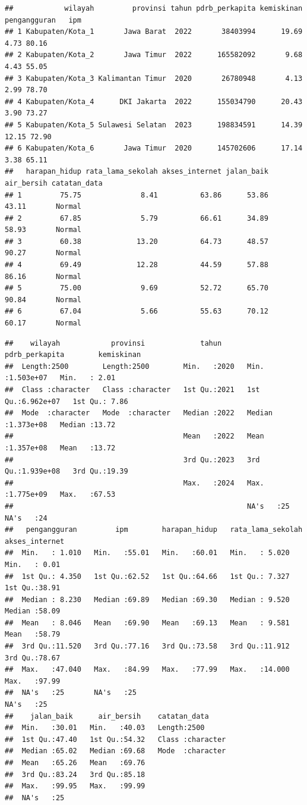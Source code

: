\documentclass[
  12pt,
]{article}
\begin{document}
\begin{verbatim}
##            wilayah         provinsi tahun pdrb_perkapita kemiskinan pengangguran   ipm
## 1 Kabupaten/Kota_1       Jawa Barat  2022       38403994      19.69         4.73 80.16
## 2 Kabupaten/Kota_2       Jawa Timur  2022      165582092       9.68         4.43 55.05
## 3 Kabupaten/Kota_3 Kalimantan Timur  2020       26780948       4.13         2.99 78.70
## 4 Kabupaten/Kota_4      DKI Jakarta  2022      155034790      20.43         3.90 73.27
## 5 Kabupaten/Kota_5 Sulawesi Selatan  2023      198834591      14.39        12.15 72.90
## 6 Kabupaten/Kota_6       Jawa Timur  2020      145702606      17.14         3.38 65.11
##   harapan_hidup rata_lama_sekolah akses_internet jalan_baik air_bersih catatan_data
## 1         75.75              8.41          63.86      53.86      43.11       Normal
## 2         67.85              5.79          66.61      34.89      58.93       Normal
## 3         60.38             13.20          64.73      48.57      90.27       Normal
## 4         69.49             12.28          44.59      57.88      86.16       Normal
## 5         75.00              9.69          52.72      65.70      90.84       Normal
## 6         67.04              5.66          55.63      70.12      60.17       Normal
\end{verbatim}

\begin{verbatim}
##    wilayah            provinsi             tahun      pdrb_perkapita        kemiskinan   
##  Length:2500        Length:2500        Min.   :2020   Min.   :1.503e+07   Min.   : 2.01  
##  Class :character   Class :character   1st Qu.:2021   1st Qu.:6.962e+07   1st Qu.: 7.86  
##  Mode  :character   Mode  :character   Median :2022   Median :1.373e+08   Median :13.72  
##                                        Mean   :2022   Mean   :1.357e+08   Mean   :13.72  
##                                        3rd Qu.:2023   3rd Qu.:1.939e+08   3rd Qu.:19.39  
##                                        Max.   :2024   Max.   :1.775e+09   Max.   :67.53  
##                                                       NA's   :25          NA's   :24     
##   pengangguran         ipm        harapan_hidup   rata_lama_sekolah akses_internet 
##  Min.   : 1.010   Min.   :55.01   Min.   :60.01   Min.   : 5.020    Min.   : 0.01  
##  1st Qu.: 4.350   1st Qu.:62.52   1st Qu.:64.66   1st Qu.: 7.327    1st Qu.:38.91  
##  Median : 8.230   Median :69.89   Median :69.30   Median : 9.520    Median :58.09  
##  Mean   : 8.046   Mean   :69.90   Mean   :69.13   Mean   : 9.581    Mean   :58.79  
##  3rd Qu.:11.520   3rd Qu.:77.16   3rd Qu.:73.58   3rd Qu.:11.912    3rd Qu.:78.67  
##  Max.   :47.040   Max.   :84.99   Max.   :77.99   Max.   :14.000    Max.   :97.99  
##  NA's   :25       NA's   :25                                        NA's   :25     
##    jalan_baik      air_bersih    catatan_data      
##  Min.   :30.01   Min.   :40.03   Length:2500       
##  1st Qu.:47.40   1st Qu.:54.32   Class :character  
##  Median :65.02   Median :69.68   Mode  :character  
##  Mean   :65.26   Mean   :69.76                     
##  3rd Qu.:83.24   3rd Qu.:85.18                     
##  Max.   :99.95   Max.   :99.99                     
##  NA's   :25
\end{verbatim}
\end{document}
